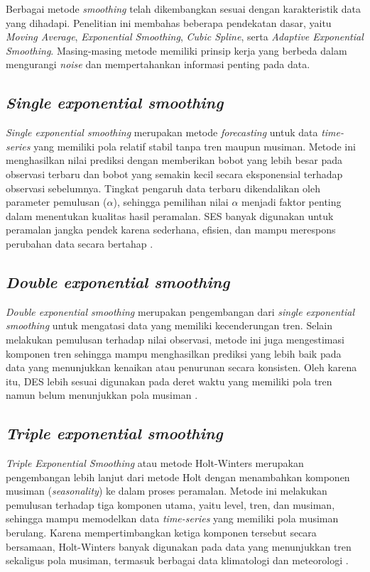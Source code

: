 Berbagai metode \textit{smoothing} telah dikembangkan sesuai dengan karakteristik data yang dihadapi. Penelitian ini membahas beberapa pendekatan dasar, yaitu \textit{Moving Average}, \textit{Exponential Smoothing}, \textit{Cubic Spline}, serta \textit{Adaptive Exponential Smoothing}. Masing-masing metode memiliki prinsip kerja yang berbeda dalam mengurangi \textit{noise} dan mempertahankan informasi penting pada data.

\subsection{\textit{Single exponential smoothing}}
\textit{Single exponential smoothing} merupakan metode \textit{forecasting} untuk data \textit{time-series} yang memiliki pola relatif stabil tanpa tren maupun musiman. Metode ini menghasilkan nilai prediksi dengan memberikan bobot yang lebih besar pada observasi terbaru dan bobot yang semakin kecil secara eksponensial terhadap observasi sebelumnya. Tingkat pengaruh data terbaru dikendalikan oleh parameter pemulusan ($\alpha$), sehingga pemilihan nilai $\alpha$ menjadi faktor penting dalam menentukan kualitas hasil peramalan. SES banyak digunakan untuk peramalan jangka pendek karena sederhana, efisien, dan mampu merespons perubahan data secara bertahap \citep{ostertagova2012}.

\subsection{\textit{Double exponential smoothing}}
\textit{Double exponential smoothing} merupakan pengembangan dari \textit{single exponential smoothing} untuk mengatasi data yang memiliki kecenderungan tren. Selain melakukan pemulusan terhadap nilai observasi, metode ini juga mengestimasi komponen tren sehingga mampu menghasilkan prediksi yang lebih baik pada data yang menunjukkan kenaikan atau penurunan secara konsisten. Oleh karena itu, DES lebih sesuai digunakan pada deret waktu yang memiliki pola tren namun belum menunjukkan pola musiman \citep{andriani2022}.

\subsection{\textit{Triple exponential smoothing}}
\textit{Triple Exponential Smoothing} atau metode Holt-Winters merupakan pengembangan lebih lanjut dari metode Holt dengan menambahkan komponen musiman (\textit{seasonality}) ke dalam proses peramalan. Metode ini melakukan pemulusan terhadap tiga komponen utama, yaitu level, tren, dan musiman, sehingga mampu memodelkan data \textit{time-series} yang memiliki pola musiman berulang. Karena mempertimbangkan ketiga komponen tersebut secara bersamaan, Holt-Winters banyak digunakan pada data yang menunjukkan tren sekaligus pola musiman, termasuk berbagai data klimatologi dan meteorologi \citep{andriani2022}.

